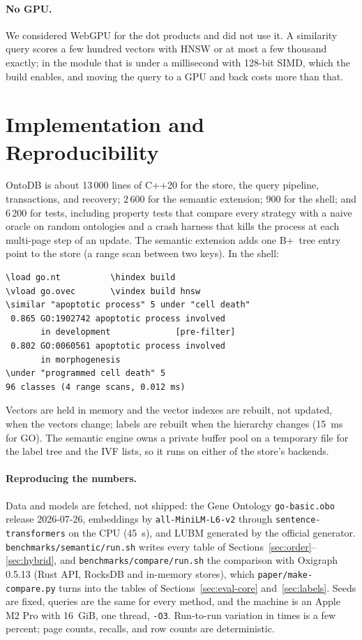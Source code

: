 \documentclass[sigconf, nonacm]{acmart}
\newcommand{\sys}{OntoDB}
\newcommand{\code}[1]{\texttt{#1}}
\begin{document}
\paragraph{No GPU.} We considered WebGPU for the dot products and did not use it. A similarity query scores a few hundred vectors with HNSW or at most a few thousand exactly; in the module that is under a millisecond with 128-bit SIMD, which the build enables, and moving the query to a GPU and back costs more than that.

\section{Implementation and Reproducibility}
\label{sec:impl}

\sys{} is about 13\,000 lines of C++20 for the store, the query pipeline, transactions, and recovery; 2\,600 for the semantic extension; 900 for the shell; and 6\,200 for tests, including property tests that compare every strategy with a naive oracle on random ontologies and a crash harness that kills the process at each multi-page step of an update. The semantic extension adds one B+~tree entry point to the store (a range scan between two keys). In the shell:

{\small
\begin{verbatim}
\load go.nt          \hindex build
\vload go.ovec       \vindex build hnsw
\similar "apoptotic process" 5 under "cell death"
 0.865 GO:1902742 apoptotic process involved
       in development             [pre-filter]
 0.802 GO:0060561 apoptotic process involved
       in morphogenesis
\under "programmed cell death" 5
96 classes (4 range scans, 0.012 ms)
\end{verbatim}}

Vectors are held in memory and the vector indexes are rebuilt, not updated, when the vectors change; labels are rebuilt when the hierarchy changes (15~ms for GO). The semantic engine owns a private buffer pool on a temporary file for the label tree and the IVF lists, so it runs on either of the store's backends.

\paragraph{Reproducing the numbers.} Data and models are fetched, not shipped: the Gene Ontology \code{go-basic.obo} release 2026-07-26, embeddings by \code{all-MiniLM-L6-v2} through \code{sentence-transformers} on the CPU (45~s), and LUBM generated by the official generator. \code{benchmarks/semantic/run.sh} writes every table of Sections~\ref{sec:order}--\ref{sec:hybrid}, and \code{benchmarks/compare/run.sh} the comparison with Oxigraph 0.5.13 (Rust API, RocksDB and in-memory stores), which \code{paper/make-compare.py} turns into the tables of Sections~\ref{sec:eval-core} and~\ref{sec:labels}. Seeds are fixed, queries are the same for every method, and the machine is an Apple M2 Pro with 16~GiB, one thread, \code{-O3}. Run-to-run variation in times is a few percent; page counts, recalls, and row counts are deterministic.
\end{document}
